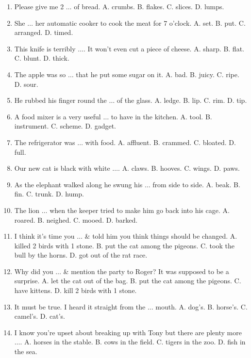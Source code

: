 \documentclass{article}
\numberwithin{equation}{section}
\begin{document}
\begin{enumerate}[leftmargin=2mm]
	\item Please give me 2 $\ldots$ of bread. {\sf A.} crumbs. {\sf B.} flakes. {\sf C.} slices. {\sf D.} lumps.
	\item She $\ldots$ her automatic cooker to cook the meat for 7 o'clock. {\sf A.} set. {\sf B.} put. {\sf C.} arranged. {\sf D.} timed.
	\item This knife is terribly $\ldots$. It won't even cut a piece of cheese. {\sf A.} sharp. {\sf B.} flat. {\sf C.} blunt. {\sf D.} thick.
	\item The apple was so $\ldots$ that he put some sugar on it. {\sf A.} bad. {\sf B.} juicy. {\sf C.} ripe. {\sf D.} sour.
	\item He rubbed his finger round the $\ldots$ of the glass. {\sf A.} ledge. {\sf B.} lip. {\sf C.} rim. {\sf D.} tip.
	\item A food mixer is a very useful $\ldots$ to have in the kitchen. {\sf A.} tool. {\sf B.} instrument. {\sf C.} scheme. {\sf D.} gadget.
	\item The refrigerator was $\ldots$ with food. {\sf A.} affluent. {\sf B.} crammed. {\sf C.} bloated. {\sf D.} full.
	\item Our new cat is black with white $\ldots$. {\sf A.} claws. {\sf B.} hooves. {\sf C.} wings. {\sf D.} paws.
	\item As the elephant walked along he swung his $\ldots$ from side to side. {\sf A.} beak. {\sf B.} fin. {\sf C.} trunk. {\sf D.} hump.
	\item The lion $\ldots$ when the keeper tried to make him go back into his cage. {\sf A.} roared. {\sf B.} neighed. {\sf C.} mooed. {\sf D.} barked.
	\item I think it's time you $\ldots$ \& told him you think things should be changed. {\sf A.} killed 2 birds with 1 stone. {\sf B.} put the cat among the pigeons. {\sf C.} took the bull by the horns. {\sf D.} got out of the rat race.
	\item Why did you $\ldots$ \& mention the party to Roger? It was supposed to be a surprise. {\sf A.} let the cat out of the bag. {\sf B.} put the cat among the pigeons. {\sf C.} have kittens. {\sf D.} kill 2 birds with 1 stone.
	\item It must be true. I heard it straight from the $\ldots$ mouth. {\sf A.} dog's. {\sf B.} horse's. {\sf C.} camel's. {\sf D.} cat's.
	\item I know you're upset about breaking up with Tony but there are plenty more $\ldots$. {\sf A.} horses in the stable. {\sf B.} cows in the field. {\sf C.} tigers in the zoo. {\sf D.} fish in the sea.

\end{enumerate}
\end{document}
